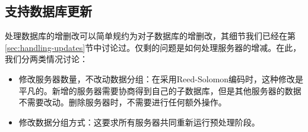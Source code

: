 \subsection{支持数据库更新}

处理数据库的增删改可以简单规约为对子数据库的增删改，其细节我们已经在第\ref{sec:handling-updates}节中讨论过。仅剩的问题是如何处理服务器的增减。在此，我们分两类情况讨论：
\begin{itemize}
    \item 修改服务器数量，不改动数据分组：在采用Reed-Solomon编码时，这种修改是平凡的。新增的服务器需要协商得到自己的子数据库，但是其他服务器的数据不需要改动。删除服务器时，不需要进行任何额外操作。
    \item 修改数据分组方式：这要求所有服务器共同重新运行预处理阶段。
\end{itemize}

